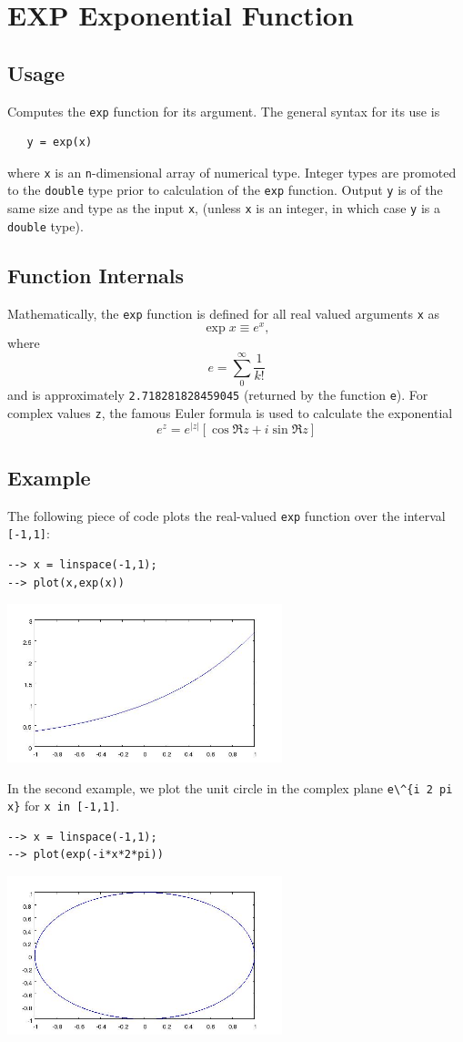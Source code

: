 \section{EXP Exponential Function}

\subsection{Usage}

Computes the \verb|exp| function for its argument.  The general
syntax for its use is
\begin{verbatim}
   y = exp(x)
\end{verbatim}
where \verb|x| is an \verb|n|-dimensional array of numerical type.
Integer types are promoted to the \verb|double| type prior to
calculation of the \verb|exp| function.  Output \verb|y| is of the
same size and type as the input \verb|x|, (unless \verb|x| is an
integer, in which case \verb|y| is a \verb|double| type).
\subsection{Function Internals}

Mathematically, the \verb|exp| function is defined for all real
valued arguments \verb|x| as
\[
  \exp x \equiv e^{x},
\]
where
\[
  e = \sum_{0}^{\infty} \frac{1}{k!}
\]
and is approximately \verb|2.718281828459045| (returned by the function 
\verb|e|).  For complex values
\verb|z|, the famous Euler formula is used to calculate the 
exponential
\[
  e^{z} = e^{|z|} \left[ \cos \Re z + i \sin \Re z \right]
\]
\subsection{Example}

The following piece of code plots the real-valued \verb|exp|
function over the interval \verb|[-1,1]|:
\begin{verbatim}
--> x = linspace(-1,1);
--> plot(x,exp(x))
\end{verbatim}


\centerline{\includegraphics[width=8cm]{expplot1}}

In the second example, we plot the unit circle in the 
complex plane \verb|e\^{i 2 pi x}| for \verb|x in [-1,1]|.
\begin{verbatim}
--> x = linspace(-1,1);
--> plot(exp(-i*x*2*pi))
\end{verbatim}


\centerline{\includegraphics[width=8cm]{expplot2}}

